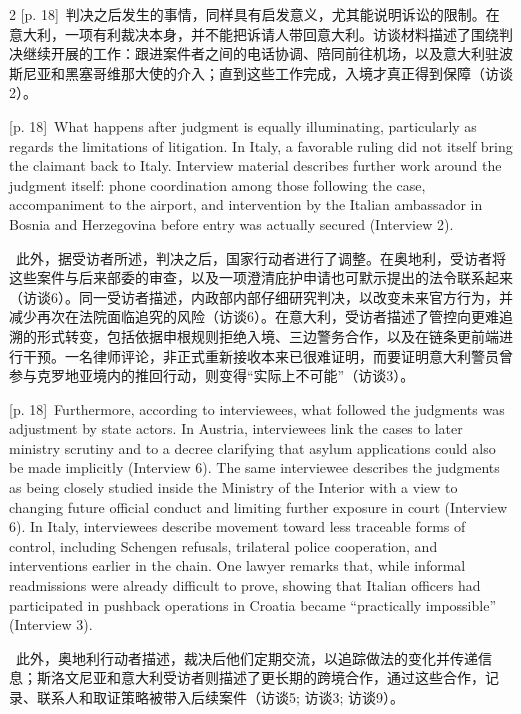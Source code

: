 \documentclass[10pt,a4paper]{article}
\begin{document}
\begin{paracol}{2}
{\scriptsize\color{gray} [p. 18]}\ 判决之后发生的事情，同样具有启发意义，尤其能说明诉讼的限制。在意大利，一项有利裁决本身，并不能把诉请人带回意大利。访谈材料描述了围绕判决继续开展的工作：跟进案件者之间的电话协调、陪同前往机场，以及意大利驻波斯尼亚和黑塞哥维那大使的介入；直到这些工作完成，入境才真正得到保障（访谈2）。\par
\switchcolumn
{\scriptsize\color{gray} [p. 18]}\ What happens after judgment is equally illuminating, particularly as regards the limitations of litigation. In Italy, a favorable ruling did not itself bring the claimant back to Italy. Interview material describes further work around the judgment itself: phone coordination among those following the case, accompaniment to the airport, and intervention by the Italian ambassador in Bosnia and Herzegovina before entry was actually secured (Interview 2).\par
\switchcolumn*
{\scriptsize\color{gray} [p. 18]}\ 此外，据受访者所述，判决之后，国家行动者进行了调整。在奥地利，受访者将这些案件与后来部委的审查，以及一项澄清庇护申请也可默示提出的法令联系起来（访谈6）。同一受访者描述，内政部内部仔细研究判决，以改变未来官方行为，并减少再次在法院面临追究的风险（访谈6）。在意大利，受访者描述了管控向更难追溯的形式转变，包括依据申根规则拒绝入境、三边警务合作，以及在链条更前端进行干预。一名律师评论，非正式重新接收本来已很难证明，而要证明意大利警员曾参与克罗地亚境内的推回行动，则变得“实际上不可能”（访谈3）。\par
\switchcolumn
{\scriptsize\color{gray} [p. 18]}\ Furthermore, according to interviewees, what followed the judgments was adjustment by state actors. In Austria, interviewees link the cases to later ministry scrutiny and to a decree clarifying that asylum applications could also be made implicitly (Interview 6). The same interviewee describes the judgments as being closely studied inside the Ministry of the Interior with a view to changing future official conduct and limiting further exposure in court (Interview 6). In Italy, interviewees describe movement toward less traceable forms of control, including Schengen refusals, trilateral police cooperation, and interventions earlier in the chain. One lawyer remarks that, while informal readmissions were already difficult to prove, showing that Italian officers had participated in pushback operations in Croatia became “practically impossible” (Interview 3).\par
\switchcolumn*
{\scriptsize\color{gray} [p. 18]}\ 此外，奥地利行动者描述，裁决后他们定期交流，以追踪做法的变化并传递信息；斯洛文尼亚和意大利受访者则描述了更长期的跨境合作，通过这些合作，记录、联系人和取证策略被带入后续案件（访谈5; 访谈3; 访谈9）。\par

\end{paracol}
\end{document}
